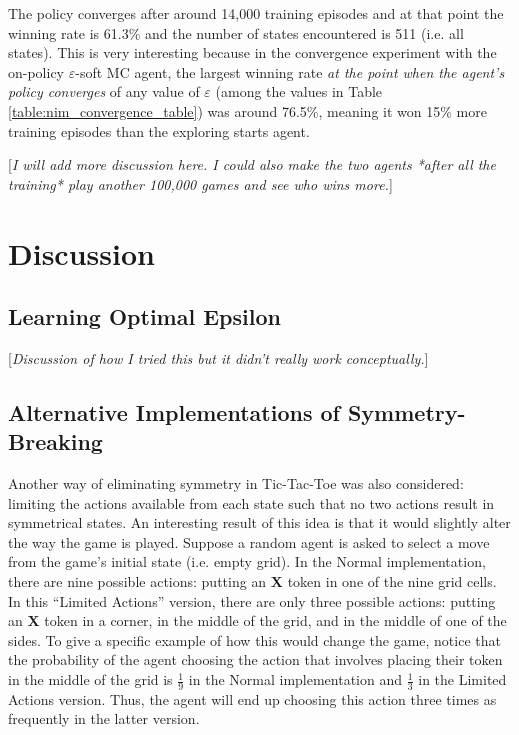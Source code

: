 \documentclass[11pt,a4paper]{report}
\begin{document}
The policy converges after around 14,000 training episodes and at that point the winning rate is 61.3\% and the number of states encountered is 511 (i.e. all states). This is very interesting because in the convergence experiment with the on-policy $\varepsilon$-soft MC agent, the largest winning rate \emph{at the point when the agent's policy converges} of any value of $\varepsilon$ (among the values in Table \ref{table:nim_convergence_table}) was around 76.5\%, meaning it won 15\% more training episodes than the exploring starts agent.

[\emph{I will add more discussion here. I could also make the two agents *after all the training* play another 100,000 games and see who wins more.}]


\chapter{Discussion}

\section{Learning Optimal Epsilon}

[\emph{Discussion of how I tried this but it didn't really work conceptually.}]

\section{Alternative Implementations of Symmetry-Breaking}

Another way of eliminating symmetry in Tic-Tac-Toe was also considered: limiting the actions available from each state such that no two actions result in symmetrical states. An interesting result of this idea is that it would slightly alter the way the game is played. Suppose a random agent is asked to select a move from the game's initial state (i.e. empty grid). In the Normal implementation, there are nine possible actions: putting an \textbf{X} token in one of the nine grid cells. In this ``Limited Actions'' version, there are only three possible actions: putting an \textbf{X} token in a corner, in the middle of the grid, and in the middle of one of the sides. To give a specific example of how this would change the game, notice that the probability of the agent choosing the action that involves placing their token in the middle of the grid is $\frac{1}{9}$ in the Normal implementation and $\frac{1}{3}$ in the Limited Actions version. Thus, the agent will end up choosing this action three times as frequently in the latter version.
\end{document}
